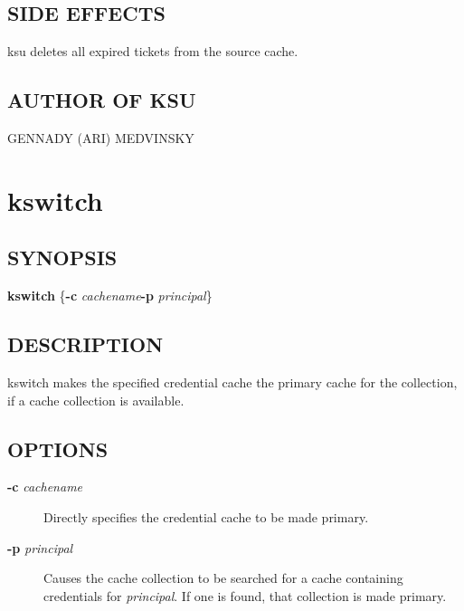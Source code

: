 \documentclass[letterpaper,10pt,english]{sphinxmanual}
\begin{document}
\subsection{SIDE EFFECTS}
\label{user/user_commands/ksu:side-effects}
ksu deletes all expired tickets from the source cache.


\subsection{AUTHOR OF KSU}
\label{user/user_commands/ksu:author-of-ksu}
GENNADY (ARI) MEDVINSKY


\section{kswitch}
\label{user/user_commands/kswitch:kswitch-1}\label{user/user_commands/kswitch:kswitch}\label{user/user_commands/kswitch::doc}

\subsection{SYNOPSIS}
\label{user/user_commands/kswitch:synopsis}
\textbf{kswitch}
\{\textbf{-c} \emph{cachename}\textbar{}\textbf{-p} \emph{principal}\}


\subsection{DESCRIPTION}
\label{user/user_commands/kswitch:description}
kswitch makes the specified credential cache the primary cache for the
collection, if a cache collection is available.


\subsection{OPTIONS}
\label{user/user_commands/kswitch:options}\begin{description}
\item[{\textbf{-c} \emph{cachename}}] \leavevmode
Directly specifies the credential cache to be made primary.

\item[{\textbf{-p} \emph{principal}}] \leavevmode
Causes the cache collection to be searched for a cache containing
credentials for \emph{principal}.  If one is found, that collection is
made primary.

\end{description}
\end{document}
